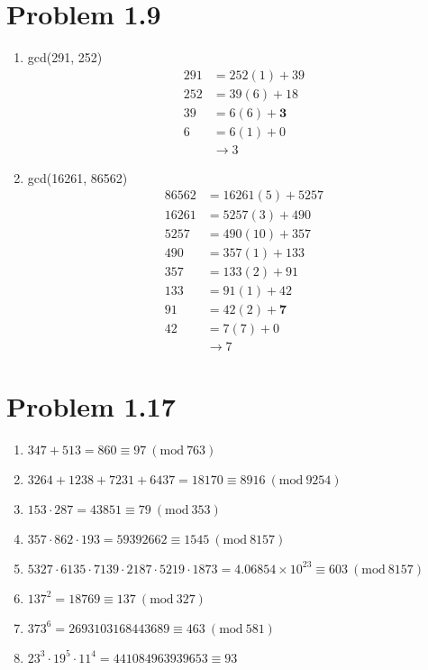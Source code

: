 \documentclass{article}
\newcommand{\Mod}[1]{\ (\mathrm{mod}\ #1)}
\begin{document}
\section*{Problem 1.9}
\begin{enumerate}[label=(\alph*)]
    \item gcd(291, 252)
          \begin{align*}
              291 & = 252 (1) + 39       \\
              252 & = 39 (6) + 18        \\
              39  & = 6 (6) + \mathbf{3} \\
              6   & = 6 (1) + 0          \\
                  & \rightarrow 3
          \end{align*}
    \item gcd(16261, 86562)
          \begin{align*}
              86562 & = 16261 (5) + 5257    \\
              16261 & = 5257 (3) + 490      \\
              5257  & = 490 (10) + 357      \\
              490   & = 357 (1) + 133       \\
              357   & = 133 (2) + 91        \\
              133   & = 91 (1) + 42         \\
              91    & = 42 (2) + \mathbf{7} \\
              42    & = 7 (7) + 0           \\
                    & \rightarrow 7
          \end{align*}
\end{enumerate}
\section*{Problem 1.17}
\begin{enumerate}[label=(\alph*)]
    \item \(347 + 513 = 860 \equiv 97 \Mod{763}\)
    \item \(3264 + 1238 + 7231 + 6437 = 18170 \equiv 8916 \Mod{9254}\)
    \item \(153 \cdot 287 = 43851 \equiv 79 \Mod{353}\)
    \item \(357 \cdot 862 \cdot 193 = 59392662 \equiv 1545\Mod{8157}\)
    \item \(5327 \cdot 6135 \cdot 7139 \cdot 2187 \cdot 5219 \cdot 1873 = 4.06854 \times 10^{23} \equiv 603\Mod{8157}\)
    \item \(137^2 = 18769 \equiv 137 \Mod{327}\)
    \item \(373^6 = 2693103168443689 \equiv 463 \Mod{581}\)
    \item \(23^3 \cdot 19^5 \cdot 11^4 = 441084963939653 \equiv 93\)
\end{enumerate}
\end{document}
